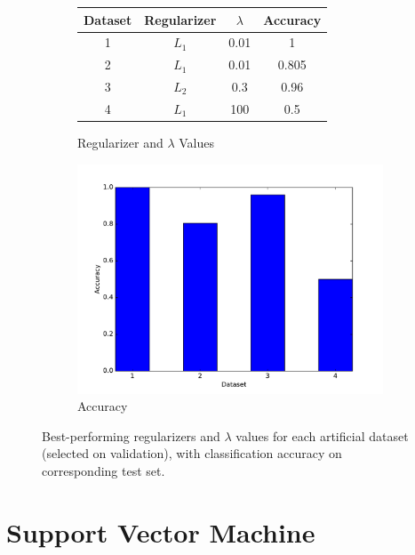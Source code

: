 \documentclass[10pt,psamsfonts]{amsart}
\theoremstyle{definition}
\theoremstyle{remark}
\numberwithin{equation}{section}
\begin{document}
\begin{figure}
	\centering
	\begin{subfigure}[b]{0.4\textwidth}
		\centering
		\begin{tabular}{c|c|c|c}\hline
			Dataset & Regularizer & $\lambda$ & Accuracy\\\hline
			1 & $L_1$ & 0.01 & 1 \\
			2 & $L_1$ & 0.01 & 0.805\\
			3 & $L_2$ & 0.3& 0.96  \\
			4 & $L_1$ & 100& 0.5 \\\hline
		\end{tabular}
		\caption{Regularizer and $\lambda$ Values}
	\end{subfigure}
	\begin{subfigure}[b]{0.35\textwidth}
		\includegraphics[width=\textwidth]{hw2_1-3_1.pdf}
		\caption{Accuracy}
	\end{subfigure}
	\caption{Best-performing regularizers and $\lambda$ values for each artificial dataset (selected on validation), with classification accuracy on corresponding test set.}
\end{figure}

\section{Support Vector Machine}
\end{document}
